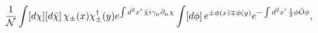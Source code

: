 \begin{equation}
\frac{1}{\cal N}\int [d\chi][d\bar{\chi}]\, \chi_\pm (x)\chi^\dagger_\pm(y) e^{\int d^2x'\, \bar{\chi}{i\gamma_{\mu}\partial_{\mu}} \chi} \int [d\phi]\, e^{\pm\phi(x)\mp\phi(y)} e^{-\int d^2x'\, \frac{1}{2}\phi\hat{O}\phi},
\end{equation}

